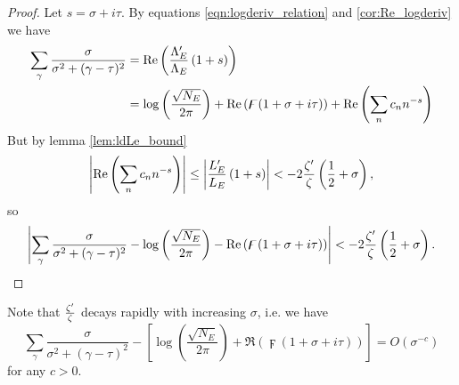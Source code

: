 \begin{proof}
Let $s = \sigma + i \tau$. By equations \ref{eqn:logderiv_relation} and \ref{cor:Re_logderiv} we have
\begin{align*}
\sum_{\gamma} \frac{\sigma}{\sigma^2+(\gamma-\tau)^2} &= \mbox{\rm Re}\left(\frac{\Lambda_E^{\prime}}{\Lambda_E}\left(1+s\right)\right) \\
&= \log\left(\frac{\sqrt{N_E}}{2\pi}\right) + \mbox{\rm Re}\left(\digamma(1+\sigma+i \tau)\right) + \mbox{\rm Re}\left(\sum_n c_n n^{-s}\right)
\end{align*}
But by lemma \ref{lem:ldLe_bound}
\begin{equation*}
\left|\mbox{\rm Re}\left(\sum_n c_n n^{-s}\right)\right| \le \left|\frac{L_E^{\prime}}{L_E}\left(1+s\right)\right| < - 2\frac{\zeta^{\prime}}{\zeta}\left(\frac{1}{2}+\sigma\right),
\end{equation*}
so
\begin{equation*}
\left|\sum_\gamma \frac{\sigma}{\sigma^2+(\gamma-\tau)^2} - \log\left(\frac{\sqrt{N_E}}{2\pi}\right) - \mbox{\rm Re}\left(\digamma(1+\sigma+i \tau)\right)\right| < - 2\frac{\zeta^{\prime}}{\zeta}\left(\frac{1}{2}+\sigma\right).
\end{equation*}
\end{proof}
Note that $\frac{\zeta^{\prime}}{\zeta}$ decays rapidly with increasing $\sigma$, i.e. we have
\begin{equation*}
\sum_\gamma \frac{\sigma}{\sigma^2+(\gamma-\tau)^2} - \left[\log\left(\frac{\sqrt{N_E}}{2\pi}\right) + \Re\left(\digamma(1+\sigma+i \tau)\right)\right] = O(\sigma^{-c})
\end{equation*}
for any $c>0$. \\

